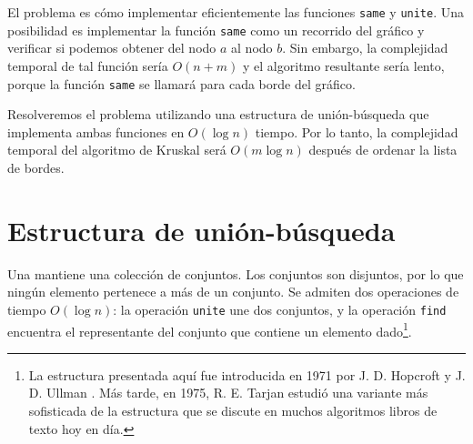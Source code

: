 El problema es cómo implementar eficientemente
las funciones \texttt{same} y \texttt{unite}.
Una posibilidad es implementar la función
\texttt{same} como un recorrido del gráfico y verificar si
podemos obtener del nodo $a$ al nodo $b$.
Sin embargo, la complejidad temporal de tal función
sería $O(n+m)$
y el algoritmo resultante sería lento,
porque la función \texttt{same} se llamará para cada borde del gráfico.

Resolveremos el problema utilizando una estructura de unión-búsqueda
que implementa ambas funciones en $O(\log n)$ tiempo.
Por lo tanto, la complejidad temporal del algoritmo de Kruskal
será $O(m \log n)$ después de ordenar la lista de bordes.

\section{Estructura de unión-búsqueda}


Una  mantiene
una colección de conjuntos.
Los conjuntos son disjuntos, por lo que ningún elemento
pertenece a más de un conjunto.
Se admiten dos operaciones de tiempo $O(\log n)$:
la operación \texttt{unite} une dos conjuntos,
y la operación \texttt{find} encuentra el representante
del conjunto que contiene un elemento dado\footnote{La estructura presentada aquí
fue introducida en 1971 por J. D. Hopcroft y J. D. Ullman \cite{hop71}.
Más tarde, en 1975, R. E. Tarjan estudió una variante más sofisticada
de la estructura \cite{tar75} que se discute en muchos algoritmos
libros de texto hoy en día.}.

